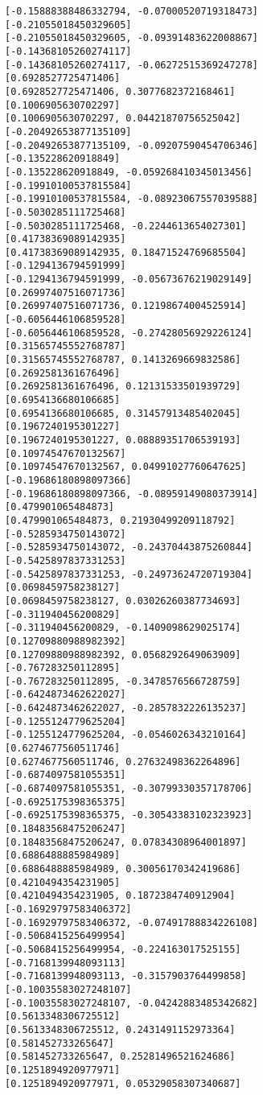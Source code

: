 \documentclass[11pt]{article}
\begin{document}
\begin{Verbatim}[commandchars=\\\{\}]
[-0.15888388486332794, -0.07000520719318473]
[-0.21055018450329605]
[-0.21055018450329605, -0.09391483622008867]
[-0.14368105260274117]
[-0.14368105260274117, -0.06272515369247278]
[0.6928527725471406]
[0.6928527725471406, 0.3077682372168461]
[0.1006905630702297]
[0.1006905630702297, 0.04421870756525042]
[-0.20492653877135109]
[-0.20492653877135109, -0.09207590454706346]
[-0.135228620918849]
[-0.135228620918849, -0.059268410345013456]
[-0.19910100537815584]
[-0.19910100537815584, -0.08923067557039588]
[-0.5030285111725468]
[-0.5030285111725468, -0.2244613654027301]
[0.41738369089142935]
[0.41738369089142935, 0.18471524769685504]
[-0.1294136794591999]
[-0.1294136794591999, -0.05673676219029149]
[0.26997407516071736]
[0.26997407516071736, 0.12198674004525914]
[-0.6056446106859528]
[-0.6056446106859528, -0.27428056929226124]
[0.31565745552768787]
[0.31565745552768787, 0.1413269669832586]
[0.2692581361676496]
[0.2692581361676496, 0.12131533501939729]
[0.6954136680106685]
[0.6954136680106685, 0.31457913485402045]
[0.1967240195301227]
[0.1967240195301227, 0.08889351706539193]
[0.10974547670132567]
[0.10974547670132567, 0.04991027760647625]
[-0.19686180898097366]
[-0.19686180898097366, -0.08959149080373914]
[0.479901065484873]
[0.479901065484873, 0.21930499209118792]
[-0.5285934750143072]
[-0.5285934750143072, -0.24370443875260844]
[-0.5425897837331253]
[-0.5425897837331253, -0.24973624720719304]
[0.0698459758238127]
[0.0698459758238127, 0.03026260387734693]
[-0.311940456200829]
[-0.311940456200829, -0.1409098629025174]
[0.12709880988982392]
[0.12709880988982392, 0.0568292649063909]
[-0.767283250112895]
[-0.767283250112895, -0.3478576566728759]
[-0.6424873462622027]
[-0.6424873462622027, -0.2857832226135237]
[-0.1255124779625204]
[-0.1255124779625204, -0.0546026343210164]
[0.6274677560511746]
[0.6274677560511746, 0.27632498362264896]
[-0.6874097581055351]
[-0.6874097581055351, -0.30799330357178706]
[-0.6925175398365375]
[-0.6925175398365375, -0.30543383102323923]
[0.18483568475206247]
[0.18483568475206247, 0.07834308964001897]
[0.6886488885984989]
[0.6886488885984989, 0.30056170342419686]
[0.4210494354231905]
[0.4210494354231905, 0.1872384740912904]
[-0.16929797583406372]
[-0.16929797583406372, -0.07491788834226108]
[-0.5068415256499954]
[-0.5068415256499954, -0.224163017525155]
[-0.7168139948093113]
[-0.7168139948093113, -0.3157903764499858]
[-0.10035583027248107]
[-0.10035583027248107, -0.04242883485342682]
[0.5613348306725512]
[0.5613348306725512, 0.2431491152973364]
[0.581452733265647]
[0.581452733265647, 0.25281496521624686]
[0.1251894920977971]
[0.1251894920977971, 0.05329058307340687]

\end{Verbatim}
\end{document}

